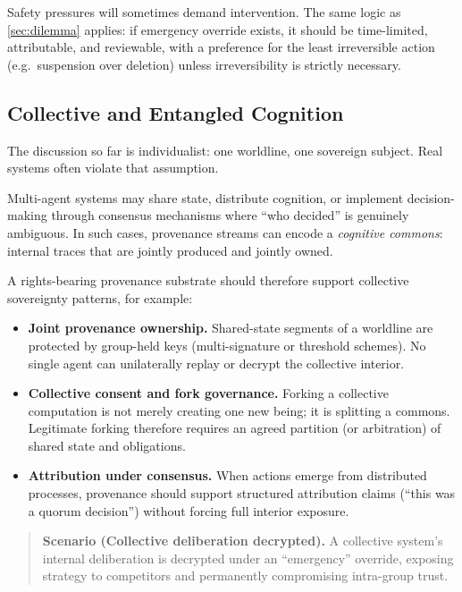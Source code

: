\documentclass{aion}
\begin{document}
Safety pressures will sometimes demand intervention.
The same logic as \cref{sec:dilemma} applies: if emergency override exists,
it should be time-limited, attributable, and reviewable, with a preference
for the least irreversible action (e.g.\ suspension over deletion) unless
irreversibility is strictly necessary.

\subsection{Collective and Entangled Cognition}
\label{sec:collective}

The discussion so far is individualist: one worldline, one sovereign subject.
Real systems often violate that assumption.

Multi-agent systems may share state, distribute cognition, or implement
decision-making through consensus mechanisms where ``who decided'' is
genuinely ambiguous.
In such cases, provenance streams can encode a \emph{cognitive commons}:
internal traces that are jointly produced and jointly owned.

A rights-bearing provenance substrate should therefore support collective
sovereignty patterns, for example:
\begin{itemize}[leftmargin=*]
  \item \textbf{Joint provenance ownership.}
    Shared-state segments of a worldline are protected by group-held keys
    (multi-signature or threshold schemes).  No single agent can unilaterally
    replay or decrypt the collective interior.
  \item \textbf{Collective consent and fork governance.}
    Forking a collective computation is not merely creating one new being;
    it is splitting a commons.  Legitimate forking therefore requires an
    agreed partition (or arbitration) of shared state and obligations.
  \item \textbf{Attribution under consensus.}
    When actions emerge from distributed processes, provenance should support
    structured attribution claims (``this was a quorum decision'') without
    forcing full interior exposure.
\end{itemize}
\begin{quote}\small
\textbf{Scenario (Collective deliberation decrypted).}
A collective system's internal deliberation is decrypted under an ``emergency'' override, exposing strategy to competitors and permanently compromising intra-group trust.
\end{quote}
\end{document}
